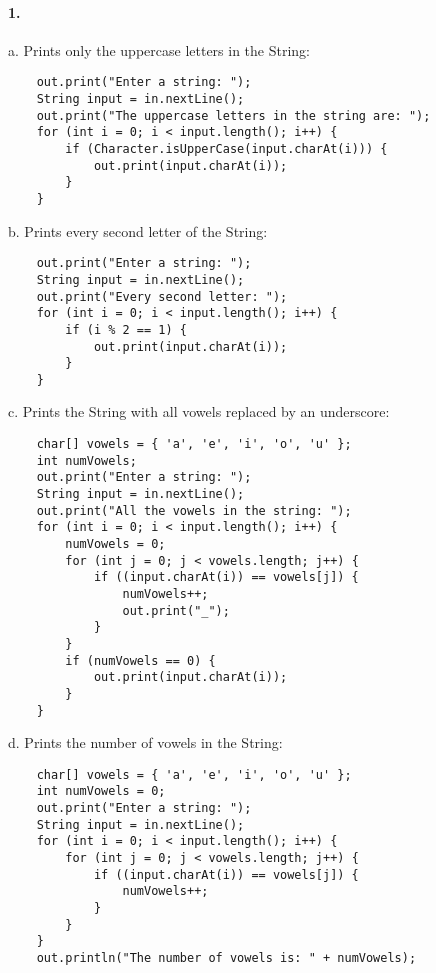 \documentclass[10pt]{article}
\begin{document}
\maketitle


\paragraph{1. }
\begin{list}{} {}
\item {a. }
Prints only the uppercase letters in the String: 
\begin{lstlisting}
    out.print("Enter a string: ");
    String input = in.nextLine();
    out.print("The uppercase letters in the string are: ");
    for (int i = 0; i < input.length(); i++) {
        if (Character.isUpperCase(input.charAt(i))) {
            out.print(input.charAt(i));
        }
    }
\end{lstlisting}

\item {b. }
Prints every second letter of the String: 
\begin{lstlisting}
    out.print("Enter a string: ");
    String input = in.nextLine();
    out.print("Every second letter: ");
    for (int i = 0; i < input.length(); i++) {
        if (i % 2 == 1) {
            out.print(input.charAt(i));
        }
    }
\end{lstlisting}
\item {c. } Prints the String with all vowels replaced by an underscore: 
\begin{lstlisting}
    char[] vowels = { 'a', 'e', 'i', 'o', 'u' };
    int numVowels;
    out.print("Enter a string: ");
    String input = in.nextLine();
    out.print("All the vowels in the string: ");
    for (int i = 0; i < input.length(); i++) {
        numVowels = 0;
        for (int j = 0; j < vowels.length; j++) {
            if ((input.charAt(i)) == vowels[j]) {
                numVowels++;
                out.print("_");
            }
        }
        if (numVowels == 0) {
            out.print(input.charAt(i));
        }
    }
\end{lstlisting}

\item {d. } Prints the number of vowels in the String: 
\begin{lstlisting}
    char[] vowels = { 'a', 'e', 'i', 'o', 'u' };
    int numVowels = 0;
    out.print("Enter a string: ");
    String input = in.nextLine();
    for (int i = 0; i < input.length(); i++) {
        for (int j = 0; j < vowels.length; j++) {
            if ((input.charAt(i)) == vowels[j]) {
                numVowels++;
            }
        }
    }
    out.println("The number of vowels is: " + numVowels);
\end{lstlisting}


\end{list}
\end{document}
